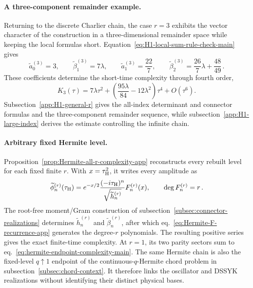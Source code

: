\documentclass[a4paper,11pt]{article}
\def\ii{i}%
\def\ee{e}%
\theoremstyle{definition}
\theoremstyle{remark}
\newcommand{\ii}{\mathrm i}
\newcommand{\ee}{\mathrm e}
\newcommand{\tphi}{\widetilde\phi}
\newcommand{\thh}{\widetilde h}
\begin{document}
\paragraph{A three-component remainder example.}
Returning to the discrete Charlier chain, the case $r=3$ exhibits the vector character of the construction in a three-dimensional remainder space while keeping the local formulas short. Equation~\eqref{eq:H1-local-sum-rule-check-main} gives
\begin{equation}
   \widetilde a_0^{(3)}=3,\qquad
   \widetilde\beta_1^{(3)}=7\lambda,\qquad
   \widetilde a_1^{(3)}=\frac{22}{7},\qquad
   \widetilde\beta_2^{(3)}=\frac{26}{7}\lambda+\frac{48}{49}\,.
   \label{eq:H1-third-jump-low-data-main}
\end{equation}
These coefficients determine the short-time complexity through fourth order,
\begin{equation}
   K_3(\tau)=7\lambda\tau^2+
   \left(\frac{95\lambda}{84}-12\lambda^2\right)\tau^4+O(\tau^6).
   \label{eq:H1-third-jump-short-time-main}
\end{equation}
Subsection~\ref{app:H1-general-r} gives the all-index determinant and connector formulas and the three-component remainder sequence, while subsection~\ref{app:H1-large-index} derives the estimate controlling the infinite chain.

\paragraph{Arbitrary fixed Hermite level.}
Proposition~\ref{prop:Hermite-all-r-complexity-app} reconstructs every rebuilt
level for each fixed finite $r$.  With $x=\tau_{\rm H}^2$, it writes every amplitude as
\begin{equation}
   \tphi_n^{(r)}(\tau_{\rm H})
   =\ee^{-x/2}\frac{(-\ii\tau_{\rm H})^n}
      {\sqrt{\thh_n^{(r)}}}F_n^{(r)}(x),
   \qquad \deg F_n^{(r)}=r\,.
   \label{eq:Hermite-all-r-amplitude-main}
\end{equation}
The root-free moment/Gram construction of subsection~\ref{subsec:connector-realizations}
determines $\thh_n^{(r)}$ and $\widetilde\beta_n^{(r)}$, after which
eq.~\eqref{eq:Hermite-F-recurrence-app} generates the degree-$r$ polynomials.  The resulting
positive series gives the exact finite-time complexity.  At $r=1$, its two parity sectors sum to
eq.~\eqref{eq:hermite-endpoint-complexity-main}.
The same Hermite chain is also the fixed-level $q\uparrow1$ endpoint of the
continuous-$q$-Hermite chord problem in subsection~\ref{subsec:chord-context}.  It therefore links
the oscillator and DSSYK realizations without identifying their distinct physical bases.
\end{document}
